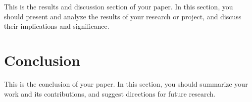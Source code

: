 \documentclass[conference]{IEEEtran}
\begin{document}
This is the results and discussion section of your paper. In this section, you should present and analyze the results of your research or project, and discuss their implications and significance.

\section{Conclusion}
\label{sec:conclusion}

This is the conclusion of your paper. In this section, you should summarize your work and its contributions, and suggest directions for future research.



\end{document}
